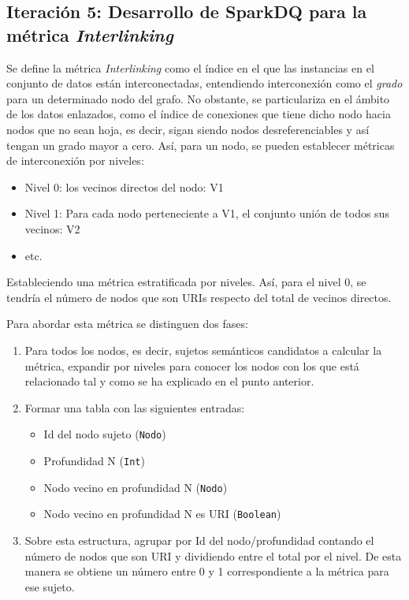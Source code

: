 \subsection{Iteración 5: Desarrollo de SparkDQ para la métrica \textit{Interlinking}}



Se define la métrica \textit{Interlinking} como el índice en el que las
instancias en el conjunto de datos están interconectadas, entendiendo
interconexión como el \textit{grado} para un determinado nodo del grafo. No
obstante, se particulariza en el ámbito de los datos enlazados, como el índice de
conexiones que tiene dicho nodo hacia nodos que no sean hoja, es decir, sigan
siendo nodos desreferenciables y así tengan un grado mayor a cero. Así,
para un nodo, se pueden establecer métricas de
interconexión por niveles:

\begin{itemize}
\item Nivel 0: los vecinos directos del nodo: V1 
\item Nivel 1: Para cada nodo perteneciente a V1, el conjunto unión de todos sus
  vecinos: V2
\item etc. 
\end{itemize}

Estableciendo una métrica estratificada por niveles. Así, para el nivel 0, se
tendría el número de nodos que son URIs respecto del total de vecinos directos. 

Para abordar esta métrica se distinguen dos fases: 

\begin{enumerate}
\item Para todos los nodos, es decir, sujetos semánticos candidatos a calcular
  la métrica, expandir por niveles para conocer los nodos con los que está
  relacionado tal y como se ha explicado en el punto anterior. 
\item Formar una tabla con las siguientes entradas: 
  \begin{itemize}
  \item Id del nodo sujeto (\texttt{Nodo})
  \item Profundidad N (\texttt{Int})
  \item Nodo vecino en profundidad N (\texttt{Nodo})
  \item Nodo vecino en profundidad N es URI (\texttt{Boolean})
  \end{itemize}
\item Sobre esta estructura, agrupar por Id del nodo/profundidad contando el
  número de nodos que son URI y dividiendo entre el total por el nivel. De esta
  manera se obtiene un número entre 0 y 1 correspondiente a la métrica para ese
  sujeto. 
\end{enumerate}


